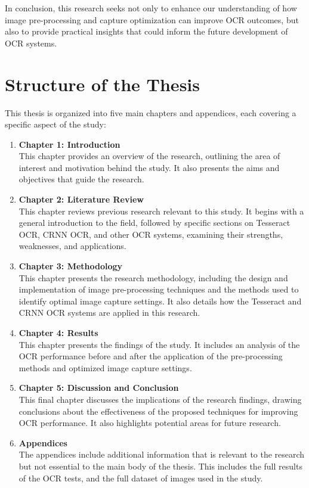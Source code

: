 In conclusion, this research seeks not only to enhance our understanding of how image pre-processing and capture optimization can improve OCR outcomes, but also to provide practical insights that could inform the future development of OCR systems.

\newpage

\section{Structure of the Thesis}

This thesis is organized into five main chapters and appendices, each covering a specific aspect of the study:

\begin{enumerate}
      \item \textbf{Chapter 1: Introduction}\\
            This chapter provides an overview of the research, outlining the area of interest and motivation behind the study. It also presents the aims and objectives that guide the research.

      \item \textbf{Chapter 2: Literature Review}\\
            This chapter reviews previous research relevant to this study. It begins with a general introduction to the field, followed by specific sections on Tesseract OCR, CRNN OCR, and other OCR systems, examining their strengths, weaknesses, and applications.

      \item \textbf{Chapter 3: Methodology}\\
            This chapter presents the research methodology, including the design and implementation of image pre-processing techniques and the methods used to identify optimal image capture settings. It also details how the Tesseract and CRNN OCR systems are applied in this research.

      \item \textbf{Chapter 4: Results}\\
            This chapter presents the findings of the study. It includes an analysis of the OCR performance before and after the application of the pre-processing methods and optimized image capture settings.

      \item \textbf{Chapter 5: Discussion and Conclusion}\\
            This final chapter discusses the implications of the research findings, drawing conclusions about the effectiveness of the proposed techniques for improving OCR performance. It also highlights potential areas for future research.

      \item \textbf{Appendices}\\
            The appendices include additional information that is relevant to the research but not essential to the main body of the thesis. This includes the full results of the OCR tests, and the full dataset of images used in the study.
\end{enumerate}


